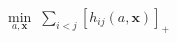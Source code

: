 \documentclass[preview]{standalone}
\begin{document}
\begin{align*}
\min_{a,\mathbf x}\;  \sum_{i<j}[h_{ij}(a,\mathbf x)]_+
\end{align*}
\end{document}
